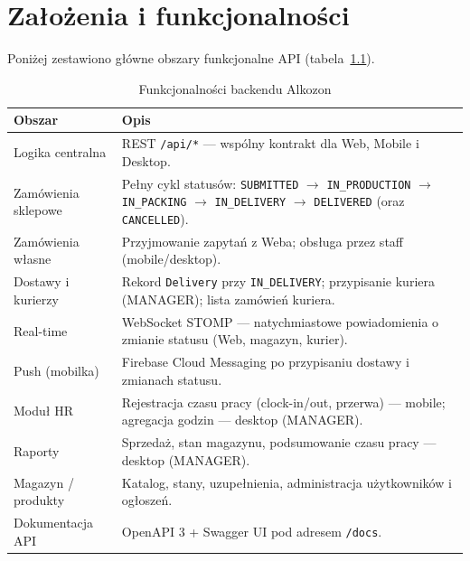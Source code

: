\documentclass[12pt,a4paper]{report}
\newcommand{\blok}[1]{\needspace{9\baselineskip}#1}
\newcommand{\tabela}[1]{\needspace{11\baselineskip}#1}
\begin{document}
\chapter{Założenia i funkcjonalności}

\blok{%
Poniżej zestawiono główne obszary funkcjonalne API (tabela~\ref{tab:funkcje}).
}

\tabela{%
\begin{table}[H]
  \centering
  \caption{Funkcjonalności backendu Alkozon}
  \label{tab:funkcje}
  \begin{tabularx}{\textwidth}{@{}lX@{}}
    \toprule
    \textbf{Obszar} & \textbf{Opis} \\
    \midrule
    Logika centralna & REST \texttt{/api/*} --- wspólny kontrakt dla Web, Mobile i Desktop. \\
    Zamówienia sklepowe & Pełny cykl statusów: \texttt{SUBMITTED} $\rightarrow$ \texttt{IN\_PRODUCTION} $\rightarrow$ \texttt{IN\_PACKING} $\rightarrow$ \texttt{IN\_DELIVERY} $\rightarrow$ \texttt{DELIVERED} (oraz \texttt{CANCELLED}). \\
    Zamówienia własne & Przyjmowanie zapytań z Weba; obsługa przez staff (mobile/desktop). \\
    Dostawy i kurierzy & Rekord \texttt{Delivery} przy \texttt{IN\_DELIVERY}; przypisanie kuriera (MANAGER); lista zamówień kuriera. \\
    Real-time & WebSocket STOMP --- natychmiastowe powiadomienia o zmianie statusu (Web, magazyn, kurier). \\
    Push (mobilka) & Firebase Cloud Messaging po przypisaniu dostawy i zmianach statusu. \\
    Moduł HR & Rejestracja czasu pracy (clock-in/out, przerwa) --- mobile; agregacja godzin --- desktop (MANAGER). \\
    Raporty & Sprzedaż, stan magazynu, podsumowanie czasu pracy --- desktop (MANAGER). \\
    Magazyn / produkty & Katalog, stany, uzupełnienia, administracja użytkowników i ogłoszeń. \\
    Dokumentacja API & OpenAPI 3 + Swagger UI pod adresem \texttt{/docs}. \\
    \bottomrule
  \end{tabularx}
\end{table}
}

\end{document}
